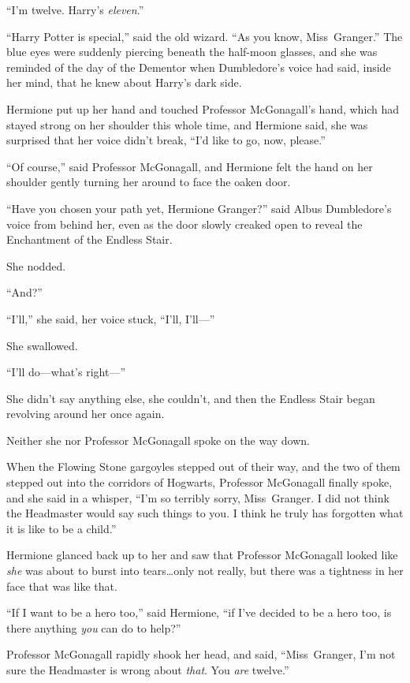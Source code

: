 “I’m twelve. Harry’s \emph{eleven}.”

“Harry Potter is special,” said the old wizard. “As you know, Miss~Granger.” The blue eyes were suddenly piercing beneath the half-moon glasses, and she was reminded of the day of the Dementor when Dumbledore’s voice had said, inside her mind, that he knew about Harry’s dark side.

Hermione put up her hand and touched Professor McGonagall’s hand, which had stayed strong on her shoulder this whole time, and Hermione said, she was surprised that her voice didn’t break, “I’d like to go, now, please.”

“Of course,” said Professor McGonagall, and Hermione felt the hand on her shoulder gently turning her around to face the oaken door.

“Have you chosen your path yet, Hermione Granger?” said Albus Dumbledore’s voice from behind her, even as the door slowly creaked open to reveal the Enchantment of the Endless Stair.

She nodded.

“And?”

“I’ll,” she said, her voice stuck, “I’ll, I’ll—”

She swallowed.

“I’ll do—what’s right—”

She didn’t say anything else, she couldn’t, and then the Endless Stair began revolving around her once again.

Neither she nor Professor McGonagall spoke on the way down.

When the Flowing Stone gargoyles stepped out of their way, and the two of them stepped out into the corridors of Hogwarts, Professor McGonagall finally spoke, and she said in a whisper, “I’m so terribly sorry, Miss~Granger. I did not think the Headmaster would say such things to you. I think he truly has forgotten what it is like to be a child.”

Hermione glanced back up to her and saw that Professor McGonagall looked like \emph{she} was about to burst into tears…only not really, but there was a tightness in her face that was like that.

“If I want to be a hero too,” said Hermione, “if I’ve decided to be a hero too, is there anything \emph{you} can do to help?”

Professor McGonagall rapidly shook her head, and said, “Miss~Granger, I’m not sure the Headmaster is wrong about \emph{that}. You \emph{are} twelve.”

